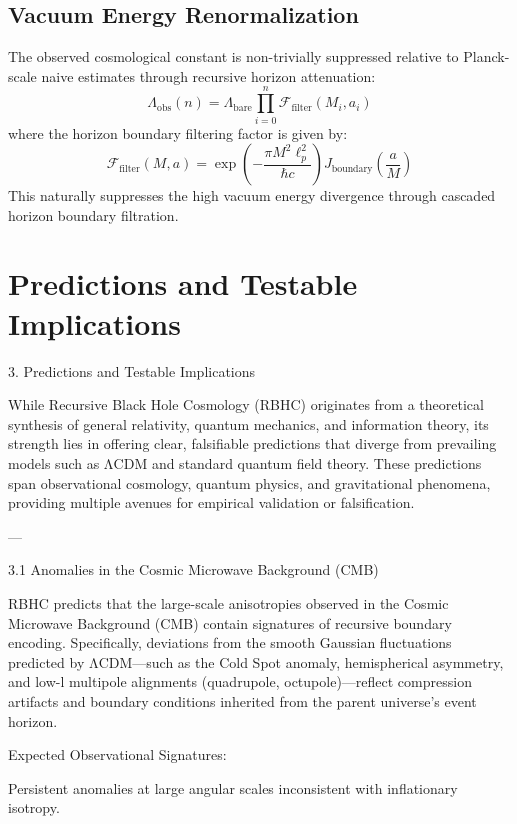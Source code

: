 \documentclass[11pt,a4paper]{article}
\begin{document}
\subsection{Vacuum Energy Renormalization}
The observed cosmological constant is non-trivially suppressed relative to Planck-scale naive estimates through recursive horizon attenuation:
\begin{equation}
\Lambda_{\text{obs}}(n) = \Lambda_{\text{bare}} \prod_{i=0}^n \mathcal{F}_{\text{filter}}(M_i, a_i)
\end{equation}
where the horizon boundary filtering factor is given by:
\begin{equation}
\mathcal{F}_{\text{filter}}(M, a) = \exp\left(-\frac{\pi M^2 \ell_p^2}{\hbar c}\right) J_{\text{boundary}}\left(\frac{a}{M}\right)
\end{equation}
This naturally suppresses the high vacuum energy divergence through cascaded horizon boundary filtration.

\section{Predictions and Testable Implications}
3. Predictions and Testable Implications

While Recursive Black Hole Cosmology (RBHC) originates from a theoretical synthesis of general relativity, quantum mechanics, and information theory, its strength lies in offering clear, falsifiable predictions that diverge from prevailing models such as ΛCDM and standard quantum field theory. These predictions span observational cosmology, quantum physics, and gravitational phenomena, providing multiple avenues for empirical validation or falsification.


---

3.1 Anomalies in the Cosmic Microwave Background (CMB)

RBHC predicts that the large-scale anisotropies observed in the Cosmic Microwave Background (CMB) contain signatures of recursive boundary encoding. Specifically, deviations from the smooth Gaussian fluctuations predicted by ΛCDM—such as the Cold Spot anomaly, hemispherical asymmetry, and low-l multipole alignments (quadrupole, octupole)—reflect compression artifacts and boundary conditions inherited from the parent universe's event horizon.

Expected Observational Signatures:

Persistent anomalies at large angular scales inconsistent with inflationary isotropy.
\end{document}

